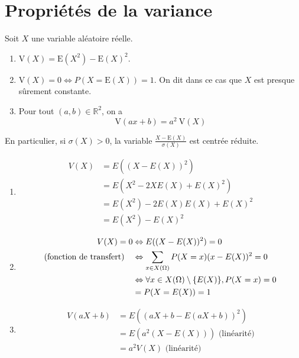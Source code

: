 \documentclass[../main.tex]{subfiles}
\begin{document}
\section{Propriétés de la variance}
\begin{tcolorbox}[title=Propostion 33.13, title filled=false, colframe=lightblue, colback=lightblue!10!white]
    Soit $X$ une variable aléatoire réelle.
    \begin{enumerate}
        \item $\mathrm{V}(X)=\mathrm{E}\left(X^2\right)-\mathrm{E}(X)^2$.
        \item $\mathrm{V}(X)=0 \Leftrightarrow P(X=\mathrm{E}(X))=1$. On dit dans ce cas que $X$ est presque sûrement constante.
        \item Pour tout $(a, b) \in \mathbb{R}^2$, on a
        $$\mathrm{V}(a x+b)=a^2 \mathrm{~V}(X)$$
    \end{enumerate}
    En particulier, si $\sigma(X)>0$, la variable $\frac{X-\mathrm{E}(X)}{\sigma(X)}$ est centrée réduite.
\end{tcolorbox}

\begin{enumerate}
    \item \begin{align*}
        V(X) &= E((X - E(X))^2) \\
        &= E(X^2 - 2X E(X) + E(X)^2) \\
        &= E(X^2) - 2E(X)E(X) + E(X)^2 \\
        &= E(X^2) - E(X)^2
    \end{align*}

    \item \begin{align*}
        V(X) = 0 &\Leftrightarrow E((X - E(X))^2) = 0 \\
        \text{(fonction de transfert)\quad}&\Leftrightarrow \sum_{x\in X(\Omega)} P(X=x) (x - E(X))^2 = 0 \\
        &\Leftrightarrow \forall x\in X(\Omega)\setminus \{E(X)\}, P(X=x) = 0 \\
        &= P(X = E(X)) = 1
    \end{align*}

    \item \begin{align*}
        V(aX + b) &= E((aX + b - E(aX + b))^2) \\
        &= E(a^2(X-E(X))) \text{ (linéarité)} \\
        &= a^2 V(X) \text{ (linéarité)}
    \end{align*}
\end{enumerate}
\end{document}

